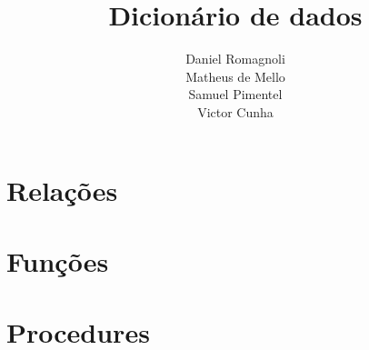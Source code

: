 \documentclass{article}
\author{Daniel Romagnoli \\ Matheus de Mello \\ Samuel Pimentel \\ Victor Cunha}
\title{Dicionário de dados}
\begin{document}
\maketitle
\newpage
\tableofcontents
\newpage

\section{Relações}


\section{Funções}


\section{Procedures}



\end{document}
